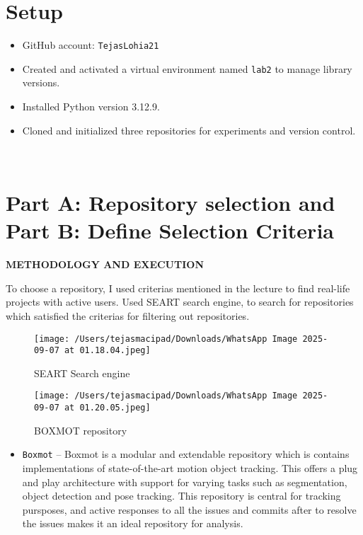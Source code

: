 \documentclass[12pt, a4paper]{report}
\newcommand{\sectionbar}[1]{%
  \vspace{0.6\baselineskip}%
  \noindent
  \colorbox{sectionbar}{%
    \parbox{\dimexpr\linewidth-2\fboxsep\relax}{%
      \textbf{\Large\textsf{#1}}%
    }%
  }%
  \vspace{0.6\baselineskip}
}
\begin{document}
\section{Setup}

\begin{itemize}
    \item GitHub account: \texttt{TejasLohia21}
    \item Created and activated a virtual environment named \texttt{lab2} to manage library versions.
    \item Installed Python version 3.12.9.
    \item Cloned and initialized three repositories for experiments and version control.
\end{itemize}

\
\section{Part A: Repository selection and Part B: Define Selection Criteria}

\sectionbar{METHODOLOGY AND EXECUTION}

To choose a repository, I used criterias mentioned in the lecture to find real-life projects with active users.
Used SEART search engine, to search for repositories which satisfied the criterias for filtering out repositories.

\begin{figure}[!h]
    \centering
    \texttt{[image: /Users/tejasmacipad/Downloads/WhatsApp Image 2025-09-07 at 01.18.04.jpeg]}
    \caption{SEART Search engine}
    \label{fig:2.1}
\end{figure}

\newpage

\begin{figure}[!h]
    \centering
    \texttt{[image: /Users/tejasmacipad/Downloads/WhatsApp Image 2025-09-07 at 01.20.05.jpeg]}
    \caption{BOXMOT repository}
    \label{fig:2.2}
\end{figure}

\begin{itemize}
    \item \texttt{Boxmot} -- Boxmot is a modular and extendable repository which is contains implementations of state-of-the-art motion object tracking. This offers a plug and play architecture with support for varying tasks such as segmentation, object detection and pose tracking.
    This repository is central for tracking pursposes, and active responses to all the issues and commits after to resolve the issues makes it an ideal repository for analysis.
\end{itemize}
\end{document}
